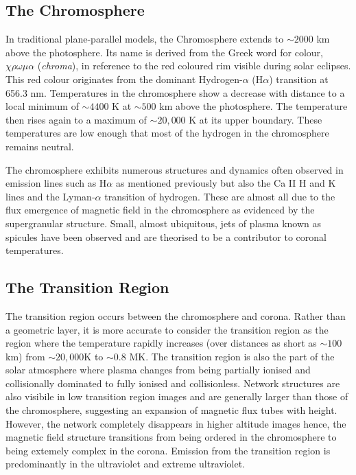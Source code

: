 \subsection{The Chromosphere}
In traditional plane-parallel models, the Chromosphere extends to $\sim 2000$ km above the photosphere. Its name is derived from the Greek word for colour, $\chi \rho \omega \mu \alpha$ (\textit{chroma}), in reference to the red coloured rim visible during solar eclipses. This red colour originates from the dominant Hydrogen-$\alpha$ (H$\alpha$) transition at 656.3 nm. Temperatures in the chromosphere show a decrease with distance to a local minimum of $\sim 4400$ K at $\sim 500$ km above the photosphere. The temperature then rises again to a maximum of $\sim 20,000$ K at its upper boundary. These temperatures are low enough that most of the hydrogen in the chromosphere remains neutral. 

The chromosphere exhibits numerous structures and dynamics often observed in emission lines such as H$\alpha$ as mentioned previously but also the Ca II H and K lines and the Lyman-$\alpha$ transition of hydrogen. These are almost all due to the flux emergence of magnetic field in the chromosphere as evidenced by the supergranular structure. Small, almost ubiquitous, jets of plasma known as spicules have been observed and are theorised to be a contributor to coronal temperatures.

\subsection{The Transition Region}
The transition region occurs between the chromosphere and corona. Rather than a geometric layer, it is more accurate to consider the transition region as the region where the temperature rapidly increases (over distances as short as $\sim 100$ km) from $\sim 20,000$K to $\sim 0.8$ MK. The transition region is also the part of the solar atmosphere where plasma changes from being partially ionised and collisionally dominated to fully ionised and collisionless. Network structures are also visibile in low transition region images and are generally larger than those of the chromosphere, suggesting an expansion of magnetic flux tubes with height. However, the network completely disappears in higher altitude images hence, the magnetic field structure transitions from being ordered in the chromosphere to being extemely complex in the corona. Emission from the transition region is predominantly in the ultraviolet and extreme ultraviolet.

